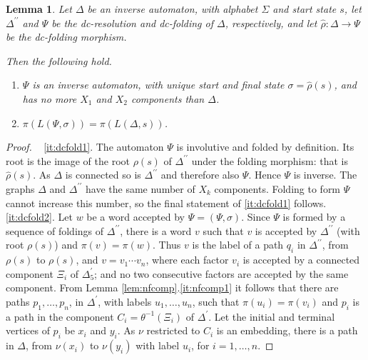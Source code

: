 \documentclass[a4paper,12pt]{article}
\newcommand{\D}{\Delta }
\newcommand{\s}{\sigma }
\renewcommand{\S}{\Sigma }
\newtheorem{lemma}[theorem]{Lemma}
\numberwithin{equation}{section}
\numberwithin{figure}{section}
\newcommand{\maps}{\rightarrow}
\newcommand{\be}{\begin{enumerate}}
\newcommand{\ee}{\end{enumerate}}
\begin{document}
\begin{lemma}\label{lem:dcfold}
Let $\D$ be  an inverse automaton, with alphabet $\S$ and start
state $s$, let $\D^{\prime\prime}$  and $\Psi$ be the
dc-resolution and dc-folding of $\D$, respectively, and 
let $\hat\rho:\D\maps \Psi$ be the dc-folding morphism. 
 
 Then the following hold. 
\be 
\item
\label{it:dcfold1} $\Psi$ is an inverse automaton, with unique
start and  final state $\s=\hat\rho(s)$, and has no more $X_1$ and
$X_2$ components than $\D$. 
\item \label{it:dcfold2}
$\pi(L(\Psi,\s))=\pi(L(\D,s))$. 
\ee
\end{lemma}
\begin{proof} ~
\ref{it:dcfold1}.
The automaton $\Psi$ is involutive and folded by definition.
 Its root is the image of the root $\rho(s)$ of $\D^{\prime\prime}$ under
 the folding morphism: that is $\hat\rho(s)$.
 As
$\D$ is connected  so is $\D^{\prime\prime}$ and therefore also
$\Psi$. Hence $\Psi$ is inverse. The graphs $\D$ and
$\D^{\prime\prime}$  have the same number of $X_k$ components.
Folding to form $\Psi$ cannot increase this number, so the final
statement of \ref{it:dcfold1} follows.
 \\[1em]
\ref{it:dcfold2}. Let $w$ be a word accepted by $\Psi=(\Psi,\s)$. Since
$\Psi$ is formed by a sequence of foldings of $\D^{\prime\prime}$,
there is a word $v$ such that $v$ is accepted by
$\D^{\prime\prime}$ (with root $\rho(s)$) and $\pi(v)=\pi(w)$. 
Thus $v$ is the label of a path $q_i$ in $\D^{\prime\prime}$, from  $\rho(s)$
to $\rho(s)$, and 
 $v=v_1\cdots v_n$,
where each factor $v_i$ is accepted by a connected component $\Xi_i$ of
$\D^\prime_5$;  and no two consecutive factors are accepted by the
same component. From Lemma \ref{lem:nfcomp}.\ref{it:nfcomp1} it
follows that there are paths $p_1,\ldots, p_n$, in $\D^\prime$,
with labels 
 $u_1,\ldots , u_n$, such that
$\pi(u_i)=\pi(v_i)$ and 
$p_i$ is a path in the component
$C_i=\theta^{-1}(\Xi_i)$ of $\D^\prime$.
Let the initial and terminal vertices of $p_i$ be $x_i$ and  $y_i$. 
As $\nu$ restricted to $C_i$ is an embedding, there is a path in $\D$,  from
$\nu(x_i)$ to $\nu(y_i)$ with label $u_i$, for $i=1,\ldots, n$.  


\end{proof}
\end{document}
